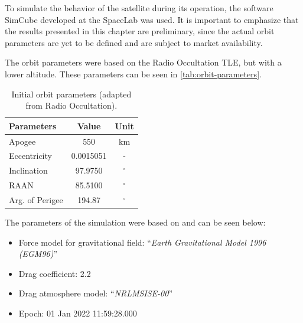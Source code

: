 To simulate the behavior of the satellite during its operation, the software SimCube developed at the SpaceLab was used. It is important to emphasize that the results presented in this chapter are preliminary, since the actual orbit parameters are yet to be defined and are subject to market availability.

The orbit parameters were based on the Radio Occultation TLE, but with a lower altitude. These parameters can be seen in \autoref{tab:orbit-parameters}.

\begin{table}[!h]
    \centering
    \begin{tabular}{lcc}
        \toprule[1.5pt]
        \textbf{Parameters} & \textbf{Value} & \textbf{Unit} \\
        \midrule
        Apogee                & 550           & km \\
        Eccentricity            & 0.0015051     & - \\
        Inclination             & 97.9750       & $^{\circ}$ \\
        RAAN                    & 85.5100       & $^{\circ}$ \\
        Arg. of Perigee         & 194.87        & $^{\circ}$ \\
        \bottomrule[1.5pt]
    \end{tabular}
    \caption{Initial orbit parameters (adapted from Radio Occultation).}
    \label{tab:orbit-parameters}
\end{table}

The parameters of the simulation were based on \cite{en13246691} and can be seen below:

\begin{itemize}
    \item Force model for gravitational field: ``\textit{Earth Gravitational Model 1996 (EGM96)}''
    \item Drag coefficient: 2.2
    \item Drag atmosphere model: ``\textit{NRLMSISE-00}''
    \item Epoch: 01 Jan 2022 11:59:28.000
\end{itemize}

